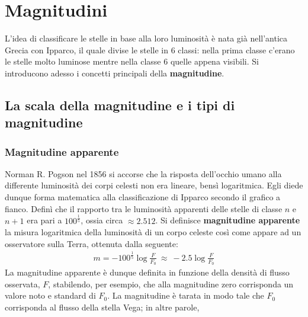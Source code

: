 \documentclass[a4paper, oneside]{book}
\begin{document}
\chapter{Magnitudini}
L'idea di classificare le stelle in base alla loro luminosità è nata
già nell'antica Grecia con Ipparco, il quale divise le stelle
in 6 classi: nella prima classe c'erano le stelle molto luminose mentre
nella classe 6 quelle appena visibili. Si introducono
adesso i concetti principali della \textbf{magnitudine}.
\section{La scala della magnitudine e i tipi di magnitudine}
\subsection{Magnitudine apparente}
\begin{figure}
    \centering
\end{figure}
Norman R. Pogson nel 1856 si accorse che la risposta dell'occhio umano alla 
differente luminosità dei corpi celesti non era lineare, bensì logaritmica. Egli 
diede dunque forma matematica alla classificazione di Ipparco secondo il grafico a fianco.
Definì che il rapporto tra le luminosità apparenti delle stelle di classe $n$ e $n+1$ era pari a
$100^{\frac{1}{5}}$, ossia circa $\approx 2.512$.  
Si definisce \textbf{magnitudine apparente} la misura logaritmica 
della luminosità di un corpo celeste così come appare ad un 
osservatore sulla Terra, ottenuta dalla seguente:
\begin{align}
    m = -100^{\frac{1}{5}}\log\frac{F}{F_0} \ \approx \ -2.5\log\frac{F}{F_0}
\end{align}
La magnitudine apparente è dunque definita in funzione della densità di flusso osservata, $F$,
stabilendo, per esempio, che alla magnitudine zero corrisponda un valore noto e standard di $F_0$. 
La magnitudine è tarata in modo tale che $F_0$ corrisponda al flusso della stella Vega; in altre parole,
\end{document}
